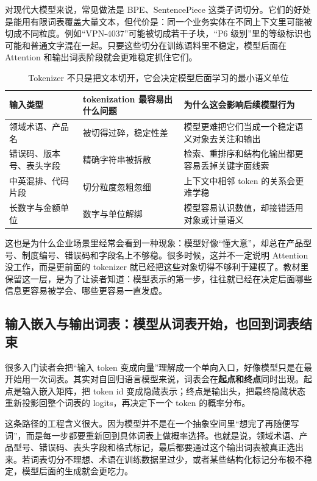 对现代大模型来说，常见做法是 BPE、SentencePiece 这类子词切分。它们的好处是能用有限词表覆盖大量文本，但代价是：同一个业务实体在不同上下文里可能被切成不同粒度。例如“VPN-4037”可能被切成若干子块，“P6 级别”里的等级标识也可能和普通文字混在一起。只要这些切分在训练语料里不稳定，模型后面在 Attention 和输出词表阶段就会更难稳定抓住它们。

\begin{table}[H]
\centering
\small
\begin{tabularx}{\textwidth}{>{\raggedright\arraybackslash}p{2.8cm}>{\raggedright\arraybackslash}p{3cm}>{\raggedright\arraybackslash}X}
\toprule
\textbf{输入类型} & \textbf{tokenization 最容易出什么问题} & \textbf{为什么这会影响后续模型行为} \\
\midrule
领域术语、产品名 & 被切得过碎，稳定性差 & 模型更难把它们当成一个稳定语义对象去关注和输出 \\
错误码、版本号、表头字段 & 精确字符串被拆散 & 检索、重排序和结构化输出都更容易丢掉关键字面线索 \\
中英混排、代码片段 & 切分粒度忽粗忽细 & 上下文中相邻 token 的关系会更难学稳 \\
长数字与金额单位 & 数字与单位解绑 & 模型容易认识数值，却接错适用对象或计量语义 \\
\bottomrule
\end{tabularx}
\caption{Tokenizer 不只是把文本切开，它会决定模型后面学习的最小语义单位}
\label{tab:tokenizer-impact}
\end{table}

这也是为什么企业场景里经常会看到一种现象：模型好像“懂大意”，却总在产品型号、制度编号、错误码和字段名上不够稳。很多时候，这并不一定说明 Attention 没工作，而是更前面的 tokenizer 就已经把这些对象切得不够利于建模了。教材里保留这一层，是为了让读者知道：模型表示的第一步，往往就已经在决定后面哪些信息更容易被学会、哪些更容易一直发虚。

\subsection{输入嵌入与输出词表：模型从词表开始，也回到词表结束}
很多入门读者会把“输入 token 变成向量”理解成一个单向入口，好像模型只是在最开始用一次词表。其实对自回归语言模型来说，词表会在\textbf{起点和终点}同时出现。起点是输入嵌入矩阵，把 token id 变成隐藏表示；终点是输出头，把最终隐藏状态重新投影回整个词表的 logits，再决定下一个 token 的概率分布。

这条路径的工程含义很大。因为模型并不是在一个抽象空间里“想完了再随便写词”，而是每一步都要重新回到具体词表上做概率选择。也就是说，领域术语、产品型号、错误码、表头字段和格式标记，最后都要通过这个输出词表被真正选出来。若词表切分不理想、术语在训练数据里过少，或者某些结构化标记分布极不稳定，模型后面的生成就会更吃力。

